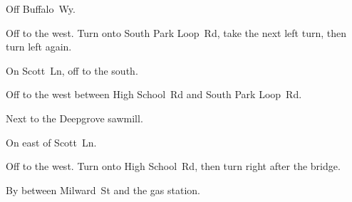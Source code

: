
\begin{LocationList}

Off  Buffalo~Wy.

Off  to the west.
Turn onto South Park Loop~Rd, take the next left turn, then turn left again.

On Scott~Ln, off  to the south.

Off  to the west between High School~Rd and South Park Loop~Rd.

\Location{\GarageHQ \Garage}
Next to the Deepgrove sawmill.

\Location{\GasStation \Gas}
On  east of Scott~Ln.

Off  to the west.
Turn onto High School~Rd, then turn right after the bridge.

By  between Milward~St and the gas station.

\end{LocationList}

